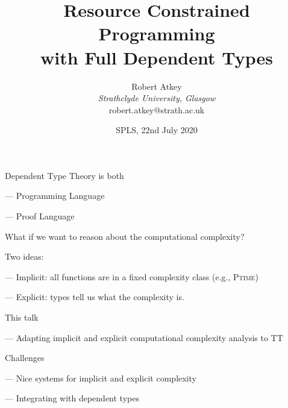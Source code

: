 \documentclass[xetex,serif,mathserif,aspectratio=169]{beamer}
\title{Resource Constrained Programming \\ with Full Dependent Types}
\author{Robert Atkey \\
  \emph{Strathclyde University, Glasgow} \\
  robert.atkey@strath.ac.uk}
\date{SPLS, 22nd July 2020}
\newcommand{\youtem}{\quad \textcolor{titlered!80}{---} \quad}
\newcommand{\HEAD}[1]{\textcolor{titlered}{#1}}
\begin{document}
\frame{\titlepage}





\begin{frame}

  \HEAD{Dependent Type Theory is both}

  \bigskip

  \youtem Programming Language

  \raggedleft {}

  \raggedright

  \medskip

  \youtem Proof Language

  \raggedleft {}


  \pause \pause \pause

\end{frame}

\begin{frame}

  What if we want to reason about the computational complexity?

  \pause
  \bigskip

  Two ideas:

  \medskip

  \youtem Implicit: all functions are in a fixed complexity class (e.g., \textsc{Ptime})

  \medskip

  \youtem Explicit: types tell us what the complexity is.

\end{frame}

\begin{frame}

  \HEAD{This talk}

  \medskip

  \youtem Adapting implicit and explicit computational complexity analysis to TT

  \bigskip

  \HEAD{Challenges}

  \medskip

  \youtem Nice systems for implicit and explicit complexity

  \medskip

  \youtem Integrating with dependent types

\end{frame}
\end{document}
